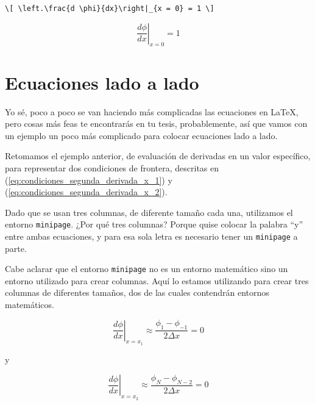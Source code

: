 \lstrulet
\noindent \begin{minipage}{0.7\linewidth}
\vspace{1.5mm}
\begin{lstlisting}[style=latex,frame={}]
\[ \left.\frac{d \phi}{dx}\right|_{x = 0} = 1 \]
\end{lstlisting}
\end{minipage}
\begin{minipage}{0.3\linewidth}
\[ \left.\frac{d \phi}{dx}\right|_{x = 0} = 1 \]
\end{minipage}
\lstruleb


\section{Ecuaciones lado a lado}
\label{sec:ecuaciones_lado_a_lado}



Yo sé, poco a poco se van haciendo más complicadas las ecuaciones en \LaTeX{}, pero cosas más feas te encontrarás en tu tesis, probablemente, así que vamos con un ejemplo un poco más complicado para colocar ecuaciones lado a lado.

Retomamos el ejemplo anterior, de evaluación de derivadas en un valor específico, para representar dos condiciones de frontera, descritas en (\ref{eq:condiciones_segunda_derivada_x_1}) y (\ref{eq:condiciones_segunda_derivada_x_2}).

Dado que se usan tres columnas, de diferente tamaño cada una, utilizamos el entorno \texttt{minipage}. ¿Por qué tres columnas? Porque quise colocar la palabra ``y'' entre ambas ecuaciones, y para esa sola letra es necesario tener un \texttt{minipage} a parte.

Cabe aclarar que el entorno \texttt{minipage} no es un entorno matemático sino un entorno utilizado para crear columnas. Aquí lo estamos utilizando para crear tres columnas de diferentes tamaños, dos de las cuales contendrán entornos matemáticos.

\noindent\begin{minipage}{0.425\linewidth}
	\begin{equation}
		\left.\frac{d \phi}{dx}\right|_{x = x_1}
			\approx \frac{\phi_{1} - \phi_{-1}}{2 \Delta x} = 0
		\label{eq:condiciones_segunda_derivada_x_1}
	\end{equation}
\end{minipage}
\begin{minipage}{0.10\linewidth}
	\begin{center}
		\vspace{20pt} y
	\end{center}
\end{minipage}
\begin{minipage}{0.425\linewidth}
	\begin{equation}
		\left. \frac{d \phi}{dx}\right|_{x = x_2}
			\approx \frac{\phi_{N} - \phi_{N - 2}}{2 \Delta x} = 0
		\label{eq:condiciones_segunda_derivada_x_2}
	\end{equation}
\end{minipage} \vspace{7pt}

